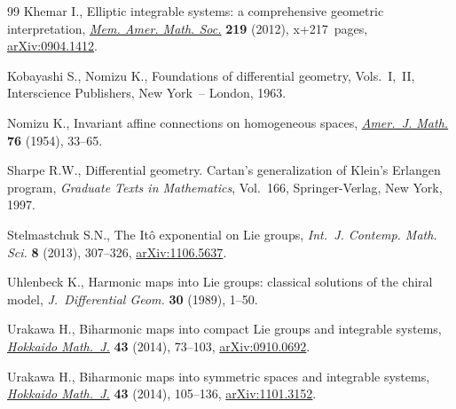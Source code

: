\documentclass[pdftex]{sigma}
\numberwithin{equation}{section}
\begin{document}
\begin{thebibliography}{99}
Khemar I., Elliptic integrable systems: a comprehensive geometric
  interpretation, \href{http://dx.doi.org/10.1090/S0065-9266-2012-00651-4}{\textit{Mem. Amer. Math. Soc.}} \textbf{219} (2012), x+217~pages,
  \href{http://arxiv.org/abs/0904.1412}{arXiv:0904.1412}.

Kobayashi S., Nomizu K., Foundations of dif\/ferential geometry,
  {V}ols.~{I},~{II}, Interscience Publishers, New York~-- London, 1963.

Nomizu K., Invariant af\/f\/ine connections on homogeneous spaces, \href{http://dx.doi.org/10.2307/2372398}{\textit{Amer.~J.
  Math.}} \textbf{76} (1954), 33--65.

Sharpe R.W., Dif\/ferential geometry. Cartan's generalization of Klein's Erlangen
  program, \textit{Graduate Texts in Mathematics}, Vol.~166, Springer-Verlag,
  New York, 1997.

Stelmastchuk S.N., The {I}t\^o exponential on {L}ie groups, \textit{Int.~J.
  Contemp. Math. Sci.} \textbf{8} (2013), 307--326, \href{http://arxiv.org/abs/1106.5637}{arXiv:1106.5637}.

Uhlenbeck K., Harmonic maps into {L}ie groups: classical solutions of the
  chiral model, \textit{J.~Differential Geom.} \textbf{30} (1989), 1--50.

Urakawa H., Biharmonic maps into compact {L}ie groups and integrable systems,
  \href{http://dx.doi.org/10.14492/hokmj/1392906095}{\textit{Hokkaido Math.~J.}} \textbf{43} (2014), 73--103, \href{http://arxiv.org/abs/0910.0692}{arXiv:0910.0692}.

Urakawa H., Biharmonic maps into symmetric spaces and integrable systems,
  \href{http://dx.doi.org/10.14492/hokmj/1392906096}{\textit{Hokkaido Math.~J.}} \textbf{43} (2014), 105--136, \href{http://arxiv.org/abs/1101.3152}{arXiv:1101.3152}.

\end{thebibliography}\LastPageEnding
\end{document}
